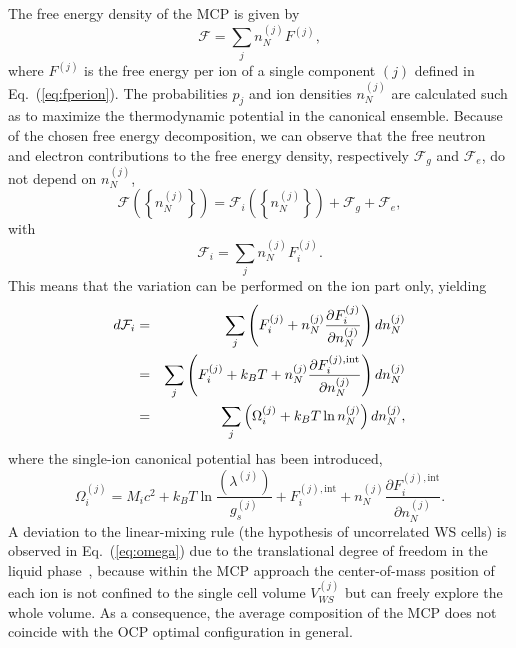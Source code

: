 The free energy density of the MCP is given by
%
\begin{equation}
  \mathcal{F} = \sum_j n_N^{(j)} F^{(j)},
\end{equation}
%
where $F^{(j)}$ is the free energy per ion of a single component $(j)$ defined 
in Eq.~(\ref{eq:fperion}).
The probabilities $p_j$ and ion densities $n_N^{(j)}$ are calculated such as to
maximize the thermodynamic potential in the canonical ensemble. 
Because of the chosen free energy decomposition, we can observe that the 
free neutron and electron contributions to the free energy density, 
respectively $\mathcal{F}_g$ and $\mathcal{F}_e$, do not depend on $n_N^{(j)}$,
%
\begin{equation}
  \mathcal{F}\left(\left\{n_N^{(j)}\right\}\right) 
  = \mathcal{F}_{i}\left(\left\{n_N^{(j)}\right\}\right) 
  + \mathcal{F}_g + \mathcal{F}_e,
\end{equation}
%
with
%
\begin{equation}
  \mathcal{F}_{i} = \sum_j n_N^{(j)} F_{i}^{(j)}.
\end{equation}
%
This means that the variation can be performed on the ion part only, yielding
%
\begin{eqnarray}
  d\mathcal{F}_{i} &=& \sum_j \left(F_{i}^{(j)} + n_N^{(j)} \frac{\partial
  F_{i}^{(j)}}{\partial n_N^{(j)}}\right)dn_N^{(j)} \notag\\
                     &=& \sum_j \left(F_{i}^{(j)} + k_B T + n_N^{(j)}
                     \frac{\partial F_i^{(j),\text{int}}}{\partial
                   n_N^{(j)}}\right)dn_N^{(j)} \notag\\
  &=& \sum_j \left(\Omega_{i}^{(j)} + k_B T \ln
  n_N^{(j)}\right)dn_N^{(j)},\label{eq:dfi}
\end{eqnarray}
%
where the single-ion canonical potential has been introduced,
%
\begin{equation}
  \Omega_{i}^{(j)} = M_{i}c^2 + k_B T\ln\frac{(\lambda^{(j)})}{g_s^{(j)}} 
  + F_i^{(j),\text{int}} 
  + n_N^{(j)} \frac{\partial F_i^{(j),\text{int}}}{\partial n_N^{(j)}}.
  \label{eq:omega}
\end{equation}
%
A deviation to the linear-mixing rule (the hypothesis of uncorrelated WS 
cells) is observed in Eq.~(\ref{eq:omega}) due to the translational degree of 
freedom in the liquid phase~\cite{Gulminelli2015}, because within the MCP 
approach the center-of-mass position of each ion is not confined to the single 
cell volume $V_{WS}^{(j)}$ but can freely explore the whole volume. As a 
consequence, the average composition of the MCP does not coincide with the OCP 
optimal configuration in general.

